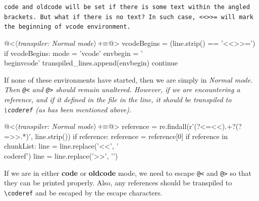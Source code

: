 \tt code \rm and \tt oldcode \rm will be set if there is some text within the angled brackets. But what if
there is no text? In such case, \verb|<<>>=| will mark the beginning of \tt vcode \rm environment.

\begin{oldcode}
@<$\langle$\textit{transpiler: Normal mode}$\rangle \thinspace +\!\!\equiv$@>
vcodeBegins = (line.strip() == '<<>>=')
if vcodeBegins:
    mode = 'vcode'
    envbegin = '\\begin{vcode}\n'
    transpiled_lines.append(envbegin)
    continue

\end{oldcode}

If none of these environments have started, then we are simply in \it Normal \rm mode. Then \verb|@<| and
\verb|@>| should remain unaltered. However, if we are encountering a reference, and if it defined in the file
in the line, it should be transpiled to \verb|\coderef| (as has been mentioned above).

\begin{oldcode}
@<$\langle$\textit{transpiler: Normal mode}$\rangle \thinspace +\!\!\equiv$@>
reference = re.findall(r'(?<=<<).+?(?=>>.*)', line.strip())
if reference:
    reference = reference[0]
    if reference in chunkList:
        line = line.replace('<<', '\\coderef{')
        line = line.replace('>>', '}')

\end{oldcode}

If we are in either \textbf{code} or \textbf{oldcode} mode, we need to escape \verb|@<| and
\verb|@>| so that they can be printed properly. Also, any references should be transpiled to \verb|\coderef|
and be escaped by the escape characters.


